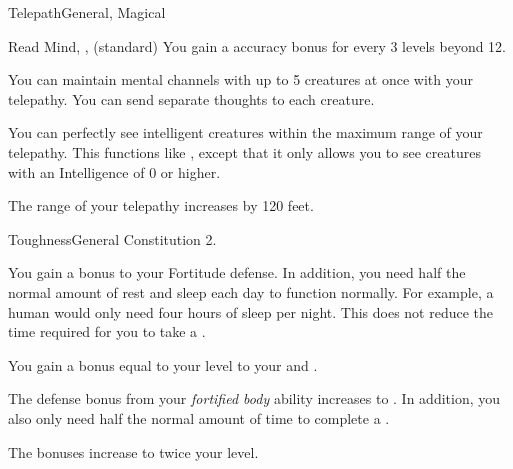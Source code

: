 \begin{magicalfeat}{Telepath}{General, Magical}
\begin{magicalsustainability}{Read Mind}{, ,  (standard)}
      \rankline
      You gain a  accuracy bonus for every 3 levels beyond 12.
    \end{magicalsustainability}

     You can maintain mental channels with up to 5 creatures at once with your telepathy.
    You can send separate thoughts to each creature.

     You can perfectly see intelligent creatures within the maximum range of your telepathy.
    This functions like , except that it only allows you to see creatures with an Intelligence of 0 or higher.

     The range of your telepathy increases by 120 feet.
  \end{magicalfeat}

  \begin{feat}{Toughness}{General}
    \featpre Constitution 2.

     You gain a  bonus to your Fortitude defense.
    In addition, you need half the normal amount of rest and sleep each day to function normally.
    For example, a human would only need four hours of sleep per night.
    This does not reduce the time required for you to take a .

     You gain a bonus equal to your level to your  and .

     The defense bonus from your \textit{fortified body} ability increases to .
    In addition, you also only need half the normal amount of time to complete a .

     The bonuses increase to twice your level.
  \end{feat}

